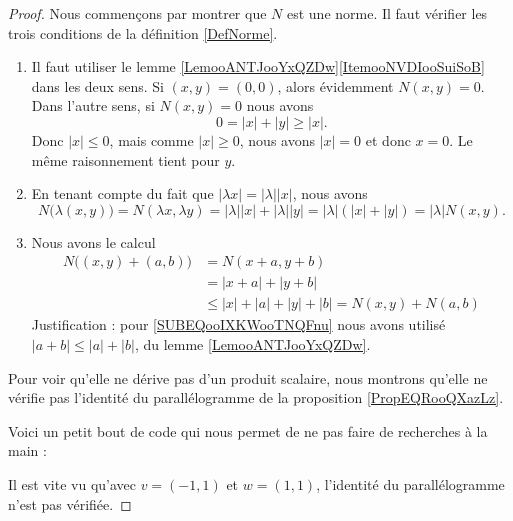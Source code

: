 \begin{proof}
    Nous commençons par montrer que \( N\) est une norme. Il faut vérifier les trois conditions de la définition \ref{DefNorme}.
    \begin{enumerate}
        \item
            Il faut utiliser le lemme \ref{LemooANTJooYxQZDw}\ref{ItemooNVDIooSuiSoB} dans les deux sens. Si \( (x,y)=(0,0)\), alors évidemment \( N(x,y)=0\). Dans l'autre sens, si \( N(x,y)=0\) nous avons
            \begin{equation}
                0=| x |+| y |\geq | x |.
            \end{equation}
            Donc \( | x |\leq 0\), mais comme \( | x |\geq 0\), nous avons \( | x |=0\) et donc \( x=0\). Le même raisonnement tient pour \( y\).
        \item
            En tenant compte du fait que \( | \lambda x |=| \lambda | |x |\), nous avons
            \begin{equation}
                N\big( \lambda(x,y) \big)=N(\lambda x,\lambda y)=| \lambda | |x |+| \lambda | |y |=| \lambda |(| x |+| y |)=| \lambda |N(x,y).
            \end{equation}
        \item
            Nous avons le calcul
            \begin{subequations}
                \begin{align}
        N\big( (x,y)+(a,b) \big)  & =N(x+a,y+b)             \\
                                  & =| x+a |+| y+b |        \\
                                  & \leq | x |+| a |+| y |+| b |     \label{SUBEQooIXKWooTNQFnu} =N(x,y)+N(a,b)
                \end{align}
            \end{subequations}
            Justification : pour \eqref{SUBEQooIXKWooTNQFnu} nous avons utilisé \( | a+b |\leq | a |+| b |\), du lemme \ref{LemooANTJooYxQZDw}.
    \end{enumerate}
    Pour voir qu'elle ne dérive pas d'un produit scalaire, nous montrons qu'elle ne vérifie pas l'identité du parallélogramme de la proposition \ref{PropEQRooQXazLz}.

    Voici un petit bout de code qui nous permet de ne pas faire de recherches à la main :
    

    Il est vite vu qu'avec \( v=(-1,1)\) et \( w=(1,1)\), l'identité du parallélogramme n'est pas vérifiée.
\end{proof}

